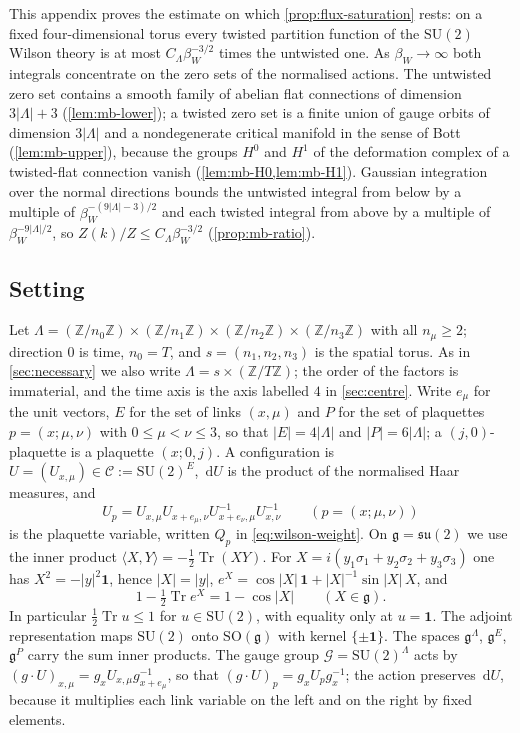 \documentclass[11pt,a4paper]{amsart}
\theoremstyle{definition}
\theoremstyle{remark}
\numberwithin{equation}{section}
\DeclareMathOperator{\Tr}{Tr}        %
\newcommand{\Z}{\mathbb{Z}}          %
\newcommand{\ip}[2]{\langle #1,#2\rangle}  %
\newcommand{\abs}[1]{\lvert #1\rvert}      %
\newcommand{\dd}{\,\mathrm{d}}             %
\newcommand{\SU}{\mathrm{SU}}              %
\newcommand{\betaW}{\beta_{W}}             %
\begin{document}
This appendix proves the estimate on which \cref{prop:flux-saturation} rests: on a fixed four-dimensional torus every twisted partition function of the $\SU(2)$ Wilson theory is at most $C_\Lambda\betaW^{-3/2}$ times the untwisted one. As $\betaW\to\infty$ both integrals concentrate on the zero sets of the normalised actions. The untwisted zero set contains a smooth family of abelian flat connections of dimension $3\abs\Lambda+3$ (\cref{lem:mb-lower}); a twisted zero set is a finite union of gauge orbits of dimension $3\abs\Lambda$ and a nondegenerate critical manifold in the sense of Bott \cite{bott1954} (\cref{lem:mb-upper}), because the groups $H^0$ and $H^1$ of the deformation complex of a twisted-flat connection vanish (\cref{lem:mb-H0,lem:mb-H1}). Gaussian integration over the normal directions bounds the untwisted integral from below by a multiple of $\betaW^{-(9\abs\Lambda-3)/2}$ and each twisted integral from above by a multiple of $\betaW^{-9\abs\Lambda/2}$, so $Z(k)/Z\le C_\Lambda\betaW^{-3/2}$ (\cref{prop:mb-ratio}).

\subsection{Setting}
Let $\Lambda=(\Z/n_0\Z)\times(\Z/n_1\Z)\times(\Z/n_2\Z)\times(\Z/n_3\Z)$ with all $n_\mu\ge2$; direction $0$ is time, $n_0=T$, and $s=(n_1,n_2,n_3)$ is the spatial torus. As in \cref{sec:necessary} we also write $\Lambda=s\times(\Z/T\Z)$; the order of the factors is immaterial, and the time axis is the axis labelled $4$ in \cref{sec:centre}. Write $e_\mu$ for the unit vectors, $E$ for the set of links $(x,\mu)$ and $P$ for the set of plaquettes $p=(x;\mu,\nu)$ with $0\le\mu<\nu\le3$, so that $\abs E=4\abs\Lambda$ and $\abs P=6\abs\Lambda$; a $(j,0)$-plaquette is a plaquette $(x;0,j)$. A configuration is $U=(U_{x,\mu})\in\mathcal C:=\SU(2)^E$, $\dd U$ is the product of the normalised Haar measures, and
\begin{equation}\label{eq:mb-plaquette}
U_p=U_{x,\mu}U_{x+e_\mu,\nu}U_{x+e_\nu,\mu}^{-1}U_{x,\nu}^{-1}\qquad(p=(x;\mu,\nu))
\end{equation}
is the plaquette variable, written $Q_p$ in \eqref{eq:wilson-weight}. On $\mathfrak g=\mathfrak{su}(2)$ we use the inner product $\ip XY=-\frac12\Tr(XY)$. For $X=i(y_1\sigma_1+y_2\sigma_2+y_3\sigma_3)$ one has $X^2=-\abs y^2\mathbf 1$, hence $\abs X=\abs y$, $e^X=\cos\abs X\,\mathbf 1+\abs X^{-1}\sin\abs X\,X$, and
\begin{equation}\label{eq:mb-cos}
1-\tfrac12\Tr e^X=1-\cos\abs X\qquad(X\in\mathfrak g).
\end{equation}
In particular $\frac12\Tr u\le1$ for $u\in\SU(2)$, with equality only at $u=\mathbf 1$. The adjoint representation maps $\SU(2)$ onto $\mathrm{SO}(\mathfrak g)$ with kernel $\{\pm\mathbf 1\}$. The spaces $\mathfrak g^\Lambda$, $\mathfrak g^E$, $\mathfrak g^P$ carry the sum inner products. The gauge group $\mathcal G=\SU(2)^\Lambda$ acts by $(g\cdot U)_{x,\mu}=g_xU_{x,\mu}g_{x+e_\mu}^{-1}$, so that $(g\cdot U)_p=g_xU_pg_x^{-1}$; the action preserves $\dd U$, because it multiplies each link variable on the left and on the right by fixed elements.
\end{document}
